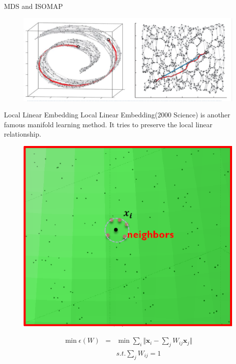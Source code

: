 \documentclass{beamer}
\newcommand{\bol}[1]{\textbf{#1}}
\begin{document}
\begin{darkframes}
\begin{frame}{MDS and ISOMAP}
   	\begin{figure}
   	\centering
   	\includegraphics[scale=0.2]{./figs/fig6.eps}
   	\end{figure}
	   
    \end{frame}
    
    \begin{frame}{Local Linear Embedding}
    \alert{Local Linear Embedding}(2000 Science) is another famous manifold learning method. It tries to preserve the local linear relationship.
    \begin{figure}
    \centering
    \includegraphics[scale=0.2]{./figs/fig7.eps}
    \end{figure}
    \vspace{-5mm}
     \begin{eqnarray*}
    	\min\epsilon(W) & = & \min\sum_i\Vert \bol{x}_i - \sum_jW_{ij}\bol{x}_j \Vert \\
    							 &     & s.t. \sum_j W_{ij} = 1
    \end{eqnarray*}
    \end{frame}
    

\end{darkframes}
\end{document}
